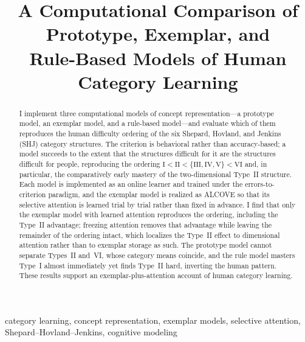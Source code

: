 \documentclass[conference]{IEEEtran}
\begin{document}
\title{A Computational Comparison of Prototype, Exemplar, and\\
Rule-Based Models of Human Category Learning}

\author{
}

\maketitle

\begin{abstract}
I implement three computational models of concept representation---a prototype
model, an exemplar model, and a rule-based model---and evaluate which of them
reproduces the human difficulty ordering of the six Shepard, Hovland, and
Jenkins (SHJ) category structures. The criterion is behavioral rather than
accuracy-based; a model succeeds to the extent that the structures difficult
for it are the structures difficult for people, reproducing the ordering
$\text{I} < \text{II} < \{\text{III},\text{IV},\text{V}\} < \text{VI}$ and, in
particular, the comparatively early mastery of the two-dimensional Type~II
structure. Each model is implemented as an online learner and trained under the
errors-to-criterion paradigm, and the exemplar model is realized as ALCOVE so
that its selective attention is learned trial by trial rather than fixed in
advance. I find that only the exemplar model with learned attention reproduces
the ordering, including the Type~II advantage; freezing attention removes that
advantage while leaving the remainder of the ordering intact, which localizes
the Type~II effect to dimensional attention rather than to exemplar storage as
such. The prototype model cannot separate Types~II and~VI, whose category means
coincide, and the rule model masters Type~I almost immediately yet finds Type~II
hard, inverting the human pattern. These results support an
exemplar-plus-attention account of human category learning.
\end{abstract}

\begin{IEEEkeywords}
category learning, concept representation, exemplar models, selective attention,
Shepard--Hovland--Jenkins, cognitive modeling
\end{IEEEkeywords}
\end{document}
